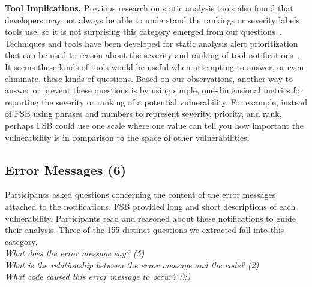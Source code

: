 \documentclass[conference]{IEEEtran}
\begin{document}
\noindent\textbf{Tool Implications.}
Previous research on static analysis tools also found that developers may not always be able to understand the rankings or severity labels tools use, so it is not surprising this category emerged from our questions~\cite{johnson2013don}.
Techniques and tools have been developed for static analysis alert prioritization that can be used to reason about the severity and ranking of tool notifications~\cite{kim2007prioritizing, boogerd2006prioritizing, kremenek2004correlation}.
It seems these kinds of tools would be useful when attempting to answer, or even eliminate, these kinds of questions. 
Based on our observations, another way to answer or prevent these questions is by using simple, one-dimensional metrics for reporting the severity or ranking of a potential vulnerability.
For example, instead of FSB using phrases and numbers to represent severity, priority, and rank, perhaps FSB could use one scale where one value can tell you how important the vulnerability is in comparison to the space of other vulnerabilities.


\noindent\subsection{\textbf{Error Messages (6)}}\label{em}

Participants asked questions concerning the content of the error messages attached to the notifications. 
FSB provided long and short descriptions of each vulnerability. 
Participants read and reasoned about these notifications to guide their analysis.
Three of the 155 distinct questions we extracted fall into this category.
\\

\noindent\emph{What does the error message say? (5)} \\
\emph{What is the relationship between the error message and the code? (2)} \\
\emph{What code caused this error message to occur? (2)} \\
\end{document}
